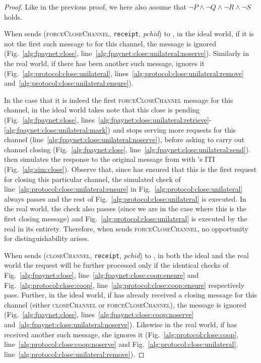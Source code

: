 \begin{proof}
  Like in the previous proof, we here also assume that $\neg P \wedge \neg Q
  \wedge \neg R \wedge \neg S$ holds.

  When \environment{} sends (\textsc{forceCloseChannel}, \texttt{receipt},
  \textit{pchid}) to \alice, in the ideal world, if it is not the first such
  message to \alice{} for this channel, the message is ignored
  (Fig.~\ref{alg:fpaynet:close},
  line~\ref{alg:fpaynet:close:unilateral:noserve}). Similarly in the real world,
  if there has been another such message, \alice{} ignores it
  (Fig.~\ref{alg:protocol:close:unilateral},
  lines~\ref{alg:protocol:close:unilateral:remove}
  and~\ref{alg:protocol:close:unilateral:ensure}).

  In the case that it is indeed the first \textsc{forceCloseChannel} message for
  this channel, in the ideal world \fpaynet{} takes note that this close is
  pending (Fig.~\ref{alg:fpaynet:close},
  lines~\ref{alg:fpaynet:close:unilateral:retrieve}-\ref{alg:fpaynet:close:unilateral:mark})
  and stops serving more requests for this channel
  (line~\ref{alg:fpaynet:close:unilateral:noserve}), before asking \simulator{}
  to carry out channel closing (Fig.~\ref{alg:fpaynet:close},
  line~\ref{alg:fpaynet:close:unilateral:send}). \simulator{} then simulates the
  response to the original message from \environment{} with \alice's ITI
  (Fig.~\ref{alg:sim:close}). Observe that, since \fpaynet{} has ensured that
  this is the first request for closing this particular channel, the simulated
  check of line~\ref{alg:protocol:close:unilateral:ensure} in
  Fig.~\ref{alg:protocol:close:unilateral} always passes and the rest of
  Fig.~\ref{alg:protocol:close:unilateral} is executed. In the real world, the
  check also passes (since we are in the case where this is the first closing
  message) and Fig.~\ref{alg:protocol:close:unilateral} is executed by the real
  \alice{} in its entirety. Therefore, when \environment{} sends
  \textsc{forceCloseChannel}, no opportunity for distinguishability arises.

  When \environment{} sends (\textsc{closeChannel}, \texttt{receipt},
  \textit{pchid}) to \alice, in both the ideal and the real world the request
  will be further processed only if the identical checks of
  Fig.~\ref{alg:fpaynet:close}, line~\ref{alg:fpaynet:close:coop:ensure} and
  Fig.~\ref{alg:protocol:close:coop}, line~\ref{alg:protocol:close:coop:ensure}
  respectively pass. Further, in the ideal world, if \alice{} has already
  received a closing message for this channel (either \textsc{closeChannel} or
  \textsc{forceCloseChannel}), the message is ignored
  (Fig.~\ref{alg:fpaynet:close}, lines~\ref{alg:fpaynet:close:coop:noserve}
  and~\ref{alg:fpaynet:close:unilateral:noserve}). Likewise in the real world,
  if \alice{} has received another such message, she ignores it
  (Fig.~\ref{alg:protocol:close:coop},
  line~\ref{alg:protocol:close:coop:noserve} and
  Fig.~\ref{alg:protocol:close:unilateral},
  line~\ref{alg:protocol:close:unilateral:remove}).


\end{proof}
